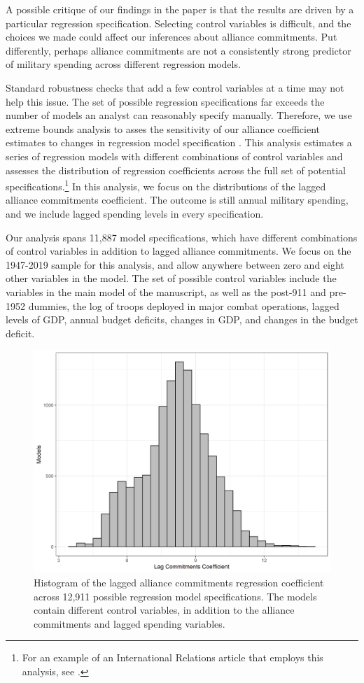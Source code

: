 \documentclass[12pt]{article}
\begin{document}
A possible critique of our findings in the paper is that the results are driven by a particular regression specification. 
Selecting control variables is difficult, and the choices we made could affect our inferences about alliance commitments. 
Put differently, perhaps alliance commitments are not a consistently strong predictor of military spending across different regression models. 


Standard robustness checks that add a few control variables at a time may not help this issue. 
The set of possible regression specifications far exceeds the number of models an analyst can reasonably specify manually.  
Therefore, we use extreme bounds analysis to asses the sensitivity of our alliance coefficient estimates to changes in regression model specification \citep{Sala-i-Martin1997}.
This analysis estimates a series of regression models with different combinations of control variables and assesses the distribution of regression coefficients across the full set of potential specifications.\footnote{For an example of an International Relations article that employs this analysis, see \citet{bellISQ16}.}
In this analysis, we focus on the distributions of the lagged alliance commitments coefficient.
The outcome is still annual military spending, and we include lagged spending levels in every specification. 

Our analysis spans 11,887 model specifications, which have different combinations of control variables in addition to lagged alliance commitments.  
We focus on the 1947-2019 sample for this analysis, and allow anywhere between zero and eight other variables in the model. 
The set of possible control variables include the variables in the main model of the manuscript, as well as the post-911 and pre-1952 dummies, the log of troops deployed in major combat operations, lagged levels of GDP, annual budget deficits, changes in GDP, and changes in the budget deficit. 


\begin{figure} 
\includegraphics[width = .95\textwidth]{eba-res.png}
\caption{Histogram of the lagged alliance commitments regression coefficient across 12,911 possible regression model specifications.
The models contain different control variables, in addition to the alliance commitments and lagged spending variables.}
\label{fig:eba-res}
\end{figure}
\end{document}
